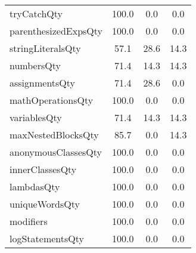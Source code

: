 \begin{tabular}{lccc}
tryCatchQty & 100.0 & 0.0 & 0.0 \\
parenthesizedExpsQty & 100.0 & 0.0 & 0.0 \\
stringLiteralsQty & 57.1 & 28.6 & 14.3 \\
numbersQty & 71.4 & 14.3 & 14.3 \\
assignmentsQty & 71.4 & 28.6 & 0.0 \\
mathOperationsQty & 100.0 & 0.0 & 0.0 \\
variablesQty & 71.4 & 14.3 & 14.3 \\
maxNestedBlocksQty & 85.7 & 0.0 & 14.3 \\
anonymousClassesQty & 100.0 & 0.0 & 0.0 \\
innerClassesQty & 100.0 & 0.0 & 0.0 \\
lambdasQty & 100.0 & 0.0 & 0.0 \\
uniqueWordsQty & 100.0 & 0.0 & 0.0 \\
modifiers & 100.0 & 0.0 & 0.0 \\
logStatementsQty & 100.0 & 0.0 & 0.0 \\
\bottomrule
              \end{tabular}
            